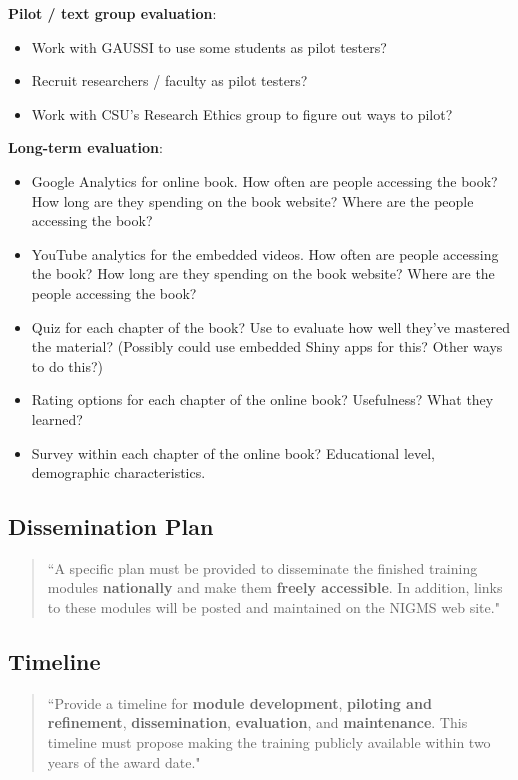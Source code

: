\documentclass[pdftex,english,12pt,parskip=half]{scrartcl}
\begin{document}
\textbf{Pilot / text group evaluation}:

\begin{itemize}
\item Work with GAUSSI to use some students as pilot testers?
\item Recruit researchers / faculty as pilot testers?
\item Work with CSU's Research Ethics group to figure out ways to pilot?
\end{itemize}

\textbf{Long-term evaluation}:

\begin{itemize}
\item Google Analytics for online book. How often are people accessing the book? How long are they spending on the book website? Where are the people accessing the book?
\item YouTube analytics for the embedded videos. How often are people accessing the book? How long are they spending on the book website? Where are the people accessing the book?
\item Quiz for each chapter of the book? Use to evaluate how well they've mastered the material? (Possibly could use embedded Shiny apps for this? Other ways to do this?)
\item Rating options for each chapter of the online book? Usefulness? What they learned?
\item Survey within each chapter of the online book? Educational level, demographic characteristics.
\end{itemize}

\subsection{Dissemination Plan}

\begin{quotation}
``A specific plan must be provided to disseminate the finished training modules \textbf{nationally} and make them \textbf{freely accessible}. In addition, links to these modules will be posted and maintained on the NIGMS web site."
\end{quotation}
    
\subsection{Timeline}

\begin{quotation}
``Provide a timeline for \textbf{module development}, \textbf{piloting and refinement}, \textbf{dissemination}, \textbf{evaluation}, and \textbf{maintenance}.  This timeline must propose making the training publicly available within two years of the award date."
\end{quotation}
\end{document}
